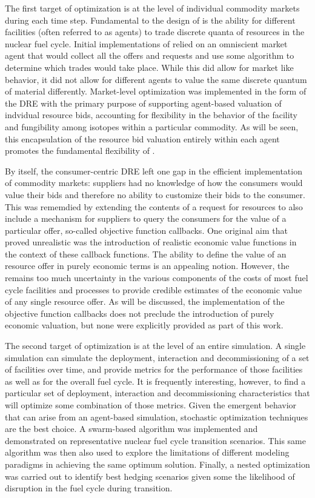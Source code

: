 The first target of optimization is at the level of individual commodity
markets during each time step.  Fundamental to the design of \Cyclus is the
ability for different facilities (often referred to as agents) to trade
discrete quanta of resources in the nuclear fuel cycle.  Initial
implementations of \Cyclus relied on an omniscient market agent that would
collect all the offers and requests and use some algorithm to determine which
trades would take place.  While this did allow for market like behavior, it
did not allow for different agents to value the same discrete quantum of
material differently.  Market-level optimization was implemented in the form
of the \gls{DRE} with the primary purpose of supporting agent-based valuation
of indvidual resource bids, accounting for flexibility in the behavior of the
facility and fungibility among isotopes within a particular commodity.  As
will be seen, this encapsulation of the resource bid valuation entirely within
each agent promotes the fundamental flexibility of \Cyclus.

By itself, the consumer-centric \gls{DRE} left one gap in the efficient
implementation of commodity markets: suppliers had no knowledge of how the
consumers would value their bids and therefore no ability to customize their
bids to the consumer.  This was rememdied by extending the contents of a
request for resources to also include a mechanism for suppliers to query the
consumers for the value of a particular offer, so-called objective function
callbacks.  One original aim that proved unrealistic was the introduction of
realistic economic value functions in the context of these callback functions.
The ability to define the value of an resource offer in purely economic terms
is an appealing notion.  However, the remains too much uncertainty in the
various components of the costs of most fuel cycle facilities and processes to
provide credible estimates of the economic value of any single resource offer.
As will be discussed, the implementation of the objective function callbacks
does not preclude the introduction of purely economic valuation, but none were
explicitly provided as part of this work.

The second target of optimization is at the level of an entire simulation.  A
single \Cyclus simulation can simulate the deployment, interaction and
decommissioning of a set of facilities over time, and provide metrics for the
performance of those facilities as well as for the overall fuel cycle.  It is
frequently interesting, however, to find a particular set of deployment,
interaction and decommissioning characteristics that will optimize some
combination of those metrics.  Given the emergent behavior that can arise from
an agent-based simulation, stochastic optimization techniques are the best
choice.  A swarm-based algorithm was implemented and demonstrated on
representative nuclear fuel cycle transition scenarios.  This same algorithm
was then also used to explore the limitations of different modeling paradigms
in achieving the same optimum solution.  Finally, a nested optimization was
carried out to identify best hedging scenarios given some the likelihood of
disruption in the fuel cycle during transition.

